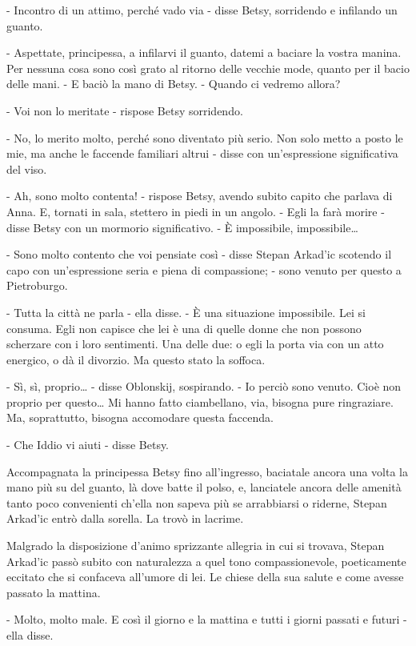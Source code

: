 - Incontro di un attimo, perché vado via - disse Betsy, sorridendo e infilando un guanto. 

- Aspettate, principessa, a infilarvi il guanto, datemi a baciare la vostra manina. Per nessuna cosa sono così grato al ritorno delle vecchie mode, quanto per il bacio delle mani. - E baciò la mano di Betsy. - Quando ci vedremo allora? 

- Voi non lo meritate - rispose Betsy sorridendo. 

- No, lo merito molto, perché sono diventato più serio. Non solo metto a posto le mie, ma anche le faccende familiari altrui - disse con un'espressione significativa del viso. 

- Ah, sono molto contenta! - rispose Betsy, avendo subito capito che parlava di Anna. E, tornati in sala, stettero in piedi in un angolo. - Egli la farà morire - disse Betsy con un mormorio significativo. - È impossibile, impossibile\ldots{} 

- Sono molto contento che voi pensiate così - disse Stepan Arkad'ic scotendo il capo con un'espressione seria e piena di compassione; - sono venuto per questo a Pietroburgo. 

- Tutta la città ne parla - ella disse. - È una situazione impossibile. Lei si consuma. Egli non capisce che lei è una di quelle donne che non possono scherzare con i loro sentimenti. Una delle due: o egli la porta via con un atto energico, o dà il divorzio. Ma questo stato la soffoca. 

- Sì, sì, proprio\ldots{} - disse Oblonskij, sospirando. - Io perciò sono venuto. Cioè non proprio per questo\ldots{} Mi hanno fatto ciambellano, via, bisogna pure ringraziare. Ma, soprattutto, bisogna accomodare questa faccenda. 

- Che Iddio vi aiuti - disse Betsy. 

Accompagnata la principessa Betsy fino all'ingresso, baciatale ancora una volta la mano più su del guanto, là dove batte il polso, e, lanciatele ancora delle amenità tanto poco convenienti ch'ella non sapeva più se arrabbiarsi o riderne, Stepan Arkad'ic entrò dalla sorella. La trovò in lacrime. 

Malgrado la disposizione d'animo sprizzante allegria in cui si trovava, Stepan Arkad'ic passò subito con naturalezza a quel tono compassionevole, poeticamente eccitato che si confaceva all'umore di lei. Le chiese della sua salute e come avesse passato la mattina. 

- Molto, molto male. E così il giorno e la mattina e tutti i giorni passati e futuri - ella disse. 

